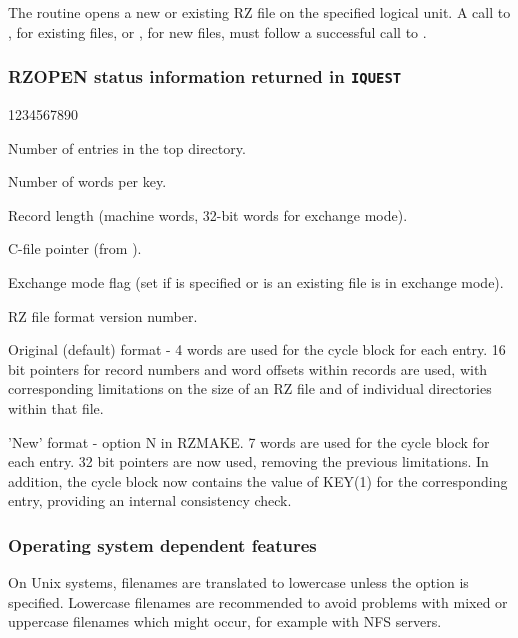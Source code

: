 The  routine opens a new or existing RZ file
on the specified logical unit. A call to , for
existing files, or , for new files, must follow
a successful call to .

\subsubsection*{RZOPEN status information returned in {\tt IQUEST}}
\begin{DLtt}{1234567890}
\item[IQUEST(7)] Number of entries in the top directory.
\item[IQUEST(8)] Number of words per key.
\item[IQUEST(10)] Record length (machine words, 32-bit words for exchange mode).
\item[IQUEST(11)] C-file pointer (from ).
\item[IQUEST(12)] Exchange mode flag (set if  is specified or is an existing
                 file is in exchange mode).
\item[IQUEST(13)] RZ file format version number.
\begin{DLtt}{12}
\item[0]Original (default) format - 4 words are used for the cycle block
for each entry. 16 bit pointers for record numbers and word offsets within
records are used, with corresponding limitations on the size of an RZ file
and of individual directories within that file.
\item[1]'New' format - option N in RZMAKE. 7 words are used for the
cycle block for each entry. 32 bit pointers are now used, removing
the previous limitations. In addition, the cycle block now contains
the value of KEY(1) for the corresponding entry, providing an internal
consistency check.
\end{DLtt}
\end{DLtt}

\subsubsection*{Operating system dependent features}


On Unix systems, filenames are translated to lowercase
unless the  option is specified. 
Lowercase filenames
are recommended to avoid problems with mixed or uppercase
filenames which might occur, for example with NFS servers.

